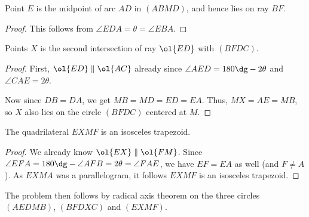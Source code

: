 \begin{claim*}
  Point $E$ is the midpoint of arc $\widehat{AD}$
  in $(ABMD)$, and hence lies on ray $BF$.
\end{claim*}
\begin{proof}
  This follows from
  $\angle EDA = \theta = \angle EBA$.
\end{proof}


\begin{claim*}
  Points $X$ is the second intersection of ray $\ol{ED}$
  with $(BFDC)$.
\end{claim*}
\begin{proof}
  First, $\ol{ED} \parallel \ol{AC}$ already since
  $\angle AED = 180\dg - 2\theta$
  and $\angle CAE = 2\theta$.

  Now since $DB = DA$, we get $MB = MD = ED = EA$.
  Thus, $MX = AE = MB$,
  so $X$ also lies on the circle $(BFDC)$ centered at $M$.
\end{proof}

\begin{claim*}
  The quadrilateral $EXMF$ is an isosceles trapezoid.
\end{claim*}
\begin{proof}
  We already know $\ol{EX} \parallel \ol{FM}$.
  Since $\angle EFA = 180\dg - \angle AFB = 2\theta = \angle FAE$,
  we have $EF = EA$ as well (and $F \neq A$).
  As $EXMA$ was a parallelogram,
  it follows $EXMF$ is an isosceles trapezoid.
\end{proof}

The problem then follows by radical axis theorem
on the three circles $(AEDMB)$, $(BFDXC)$ and $(EXMF)$.
\pagebreak